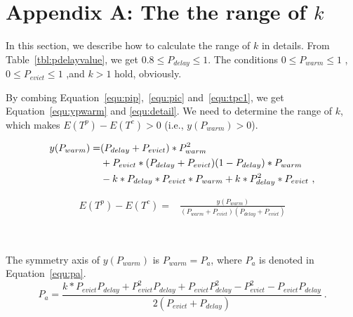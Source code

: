 \newpage
\appendix
\section{Appendix A: The the range of $k$}
\label{appendixa}
In this section, we describe how to calculate the range of $k$ in details.
From Table~\ref{tbl:pdelayvalue}, we get $0.8 \leq P_{delay} \leq 1$.
The conditions $0 \leq P_{warm} \leq 1$ , $0 \leq P_{evict} \leq 1$ ,and $k > 1$ hold, obviously.


By combing Equation~\ref{equ:pip},~\ref{equ:pic} and~\ref{equ:tpc1}, we get Equation~\ref{equ:ypwarm} and \ref{equ:detail}.
We need to determine the range of  $k$, which makes $E(T^{p}) - E(T^{c})>0$ (i.e., $y(P_{warm}) > 0$).

\begin{equation}
\label{equ:ypwarm}
\begin{split}
\scriptsize
y(P_{warm}) = &(P_{delay}+P_{evict})*P_{warm}^{2} \\
& +  P_{evict}*(P_{delay}+P_{evict})(1-P_{delay})*P_{warm}\\
& - k*P_{delay}*P_{evict}*P_{warm}+ k*P_{delay}^{2}*P_{evict} \ ,
\end{split}\end{equation}

\begin{equation}
\label{equ:detail}
\begin{split}
E(T^{p}) - E(T^{c}) = &\frac{y(P_{warm})}{(P_{warm}+P_{evict})(P_{delay}+P_{evict})}
\end{split}\end{equation}


 \ \par
The symmetry axis of $y(P_{warm})$ is $P_{warm} = P_{a}$, where $P_{a}$ is denoted in Equation~\ref{equ:pa}.
\begin{equation}
\label{equ:pa}
P_{a} = \frac{k*P_{evict}P_{delay} + P_{evict}^{2}P_{delay} + P_{evict}P_{delay}^{2} - P_{evict}^{2} - P_{evict}P_{delay}}{2(P_{evict}+P_{delay})}\ .
\end{equation}

